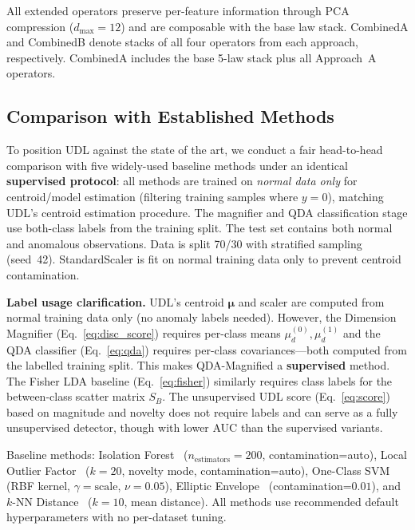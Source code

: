\documentclass[journal]{IEEEtran}
\begin{document}
All extended operators preserve per-feature information through PCA compression ($d_{\max} = 12$) and are composable with the base law stack. CombinedA and CombinedB denote stacks of all four operators from each approach, respectively. CombinedA includes the base 5-law stack plus all Approach~A operators.

\subsection{Comparison with Established Methods}
\label{ssec:sota}

To position UDL against the state of the art, we conduct a fair head-to-head comparison with five widely-used baseline methods under an identical \textbf{supervised protocol}: all methods are trained on \textit{normal data only} for centroid/model estimation (filtering training samples where $y=0$), matching UDL's centroid estimation procedure. The magnifier and QDA classification stage use both-class labels from the training split. The test set contains both normal and anomalous observations. Data is split 70/30 with stratified sampling (seed~42). StandardScaler is fit on normal training data only to prevent centroid contamination.

\textbf{Label usage clarification.} UDL's centroid $\boldsymbol{\mu}$ and scaler are computed from normal training data only (no anomaly labels needed). However, the Dimension Magnifier (Eq.~\eqref{eq:disc_score}) requires per-class means $\mu_d^{(0)}, \mu_d^{(1)}$ and the QDA classifier (Eq.~\eqref{eq:qda}) requires per-class covariances---both computed from the labelled training split. This makes QDA-Magnified a \textbf{supervised} method. The Fisher LDA baseline (Eq.~\eqref{eq:fisher}) similarly requires class labels for the between-class scatter matrix $S_B$. The unsupervised UDL score (Eq.~\eqref{eq:score}) based on magnitude and novelty does not require labels and can serve as a fully unsupervised detector, though with lower AUC than the supervised variants.

Baseline methods: Isolation Forest~\cite{liu2008isolation} ($n_{\text{estimators}}=200$, contamination=auto), Local Outlier Factor~\cite{breunig2000lof} ($k=20$, novelty mode, contamination=auto), One-Class SVM~\cite{scholkopf2001estimating} (RBF kernel, $\gamma=\text{scale}$, $\nu=0.05$), Elliptic Envelope~\cite{rousseeuw1999fast} (contamination=$0.01$), and $k$-NN Distance~\cite{ramaswamy2000efficient} ($k=10$, mean distance). All methods use recommended default hyperparameters with no per-dataset tuning.
\end{document}
